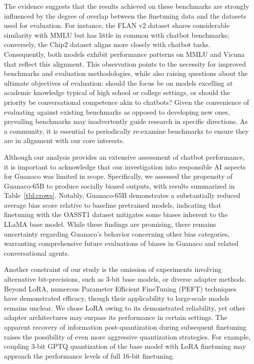 The evidence suggests that the results achieved on these benchmarks are strongly influenced by the degree of overlap between the finetuning data and the datasets used for evaluation. For instance, the FLAN v2 dataset shares considerable similarity with MMLU but has little in common with chatbot benchmarks; conversely, the Chip2 dataset aligns more closely with chatbot tasks. Consequently, both models exhibit performance patterns on MMLU and Vicuna that reflect this alignment. This observation points to the necessity for improved benchmarks and evaluation methodologies, while also raising questions about the ultimate objectives of evaluation: should the focus be on models excelling at academic knowledge typical of high school or college settings, or should the priority be conversational competence akin to chatbots? Given the convenience of evaluating against existing benchmarks as opposed to developing new ones, prevailing benchmarks may inadvertently guide research in specific directions. As a community, it is essential to periodically re-examine benchmarks to ensure they are in alignment with our core interests.

Although our analysis provides an extensive assessment of chatbot performance, it is important to acknowledge that our investigation into responsible AI aspects for {Guanaco} was limited in scope. Specifically, we assessed the propensity of {Guanaco}-65B to produce socially biased outputs, with results summarized in Table~\ref{tbl:crows}. Notably, {Guanaco}-65B demonstrates a substantially reduced average bias score relative to baseline pretrained models, indicating that finetuning with the OASST1 dataset mitigates some biases inherent to the LLaMA base model. While these findings are promising, there remains uncertainty regarding {Guanaco}'s behavior concerning other bias categories, warranting comprehensive future evaluations of biases in {Guanaco} and related conversational agents.

Another constraint of our study is the omission of experiments involving alternative bit-precisions, such as 3-bit base models, or diverse adapter methods. Beyond LoRA, numerous Parameter Efficient FineTuning (PEFT) techniques have demonstrated efficacy, though their applicability to large-scale models remains unclear. We chose LoRA owing to its demonstrated reliability, yet other adapter architectures may surpass its performance in certain settings. The apparent recovery of information post-quantization during subsequent finetuning raises the possibility of even more aggressive quantization strategies. For example, coupling 3-bit GPTQ quantization of the base model with LoRA finetuning may approach the performance levels of full 16-bit finetuning.

